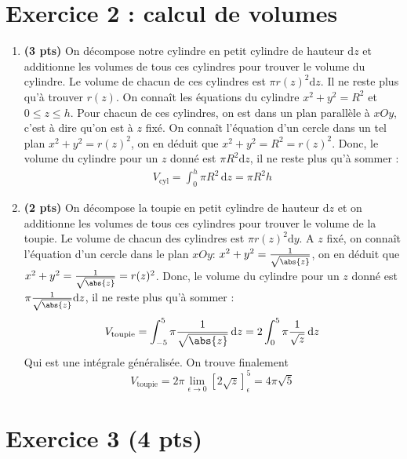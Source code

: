 \documentclass[fleqn]{article}
\begin{document}
\section{Exercice 2 : calcul de volumes}
\begin{enumerate}
\item \textbf{(3 pts)} On décompose notre cylindre en petit cylindre de hauteur $\mathrm{d} z$ et additionne les volumes de tous ces cylindres pour trouver le volume du cylindre. Le volume de chacun de ces cylindres est $\pi r(z)^2 \mathrm{d} z$. Il ne reste plus qu'à trouver $r(z)$.\newline
On connaît les équations du cylindre $x^2 + y^2 = R^2$ et $0\leq z \leq h$. Pour chacun de ces cylindres, on est dans un plan parallèle à $xOy$, c'est à dire qu'on est à $z$ fixé. On connaît l'équation d'un cercle dans un tel plan $x^2+y^2 = r(z)^2$, on en déduit que $x^2 + y^2 = R^2 = r(z)^2$. Donc, le volume du cylindre pour un $z$ donné est $\pi R^2 \mathrm{d} z $, il ne reste plus qu'à sommer :
\begin{align*}
    V_{\mathrm{cyl}} = \displaystyle \int_{0}^{h} \pi R^2 \, \mathrm{d} z = \pi R^2 h
\end{align*}
\item \textbf{(2 pts)} On décompose la toupie en petit cylindre de hauteur $\mathrm{d} z$ et on  additionne les volumes de tous ces cylindres pour trouver le volume de la toupie. Le volume de chacun des cylindres est $\pi r(z)^2 \mathrm{d} y$.\newline
A $z$ fixé, on connaît l'équation d'un cercle dans le plan $xOy$: $x^2+y^2 = \frac{1}{\sqrt{\abs{z}}}$, on en déduit que $x^2 + y^2 =  \frac{1}{\sqrt{\abs{z}}} = r(z)^2$. Donc, le volume du cylindre pour un $z$ donné est $\pi  \frac{1}{\sqrt{\abs{z}}} \mathrm{d} z $, il ne reste plus qu'à sommer :
\begin{equation}
    V_{\mathrm{toupie}} = \displaystyle \int_{-5}^{5} \pi  \frac{1}{\sqrt{\abs{z}}} \, \mathrm{d} z = 2\displaystyle \int_{0}^{5} \pi  \frac{1}{\sqrt{z}} \, \mathrm{d} z
\end{equation}
Qui est une intégrale généralisée. On trouve finalement
\begin{equation}
    V_{\mathrm{toupie}} = 2\pi\lim \limits_{\epsilon \rightarrow 0}\left[2\sqrt{z} \right]_\epsilon^5 = 4\pi\sqrt{5}
\end{equation}
\end{enumerate}
\section{Exercice 3 \textbf{(4 pts)}}
\end{document}

